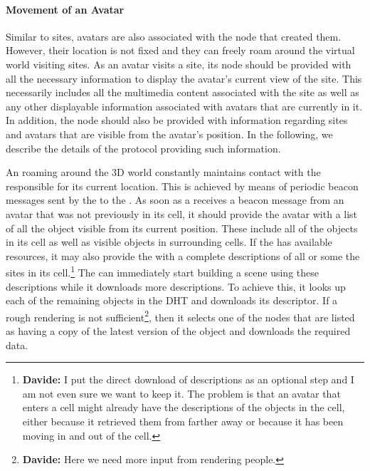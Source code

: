 \documentclass{article}
\newcommand{\df}[1]{\footnote{\textbf{Davide: }#1}}
\begin{document}
\paragraph{Movement of an Avatar}
Similar to sites, avatars are also associated with the node that
created them. However, their location is not fixed and they can freely
roam around the virtual world visiting sites. As an avatar visits a
site, its node should be provided with all the necessary information
to display the avatar's current view of the site. This necessarily
includes all the multimedia content associated with the site as well
as any other displayable information associated with avatars that are
currently in it. In addition, the node should also be provided with
information regarding sites and avatars that are visible from the
avatar's position. In the following, we describe the details of the
protocol providing such information.


An \anode roaming around the 3D world constantly maintains contact
with the \snode responsible for its current location. This is achieved
by means of periodic beacon messages sent by the \anode to the \snode.
As soon as a \snode receives a beacon message from an avatar that was
not previously in its cell, it should provide the avatar with a list
of all the object visible from its current position. These include all
of the objects in its cell as well as visible objects in surrounding
cells. If the \snode has available resources, it may also provide the
\anode with a complete descriptions of all or some the sites in its
cell.\df{I put the direct download of descriptions as an optional step
  and I am not even sure we want to keep it. The problem is that an
  avatar that enters a cell might already have the descriptions of the
  objects in the cell, either because it retrieved them from farther
  away or because it has been moving in and out of the cell.} The
\anode can immediately start building a scene using these descriptions
while it downloads more descriptions.  To achieve this, it looks up
each of the remaining objects in the DHT and downloads its
descriptor. If a rough rendering is not sufficient\df{Here we need
  more input from rendering people.}, then it selects one of the nodes
that are listed as having a copy of the latest version of the object
and downloads the required data.
\end{document}
